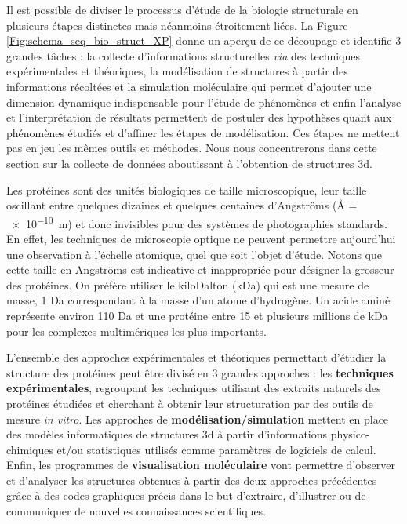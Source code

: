 Il est possible de diviser le processus d'étude de la biologie structurale en plusieurs étapes distinctes mais néanmoins étroitement liées.
La Figure \ref{Fig:schema_seq_bio_struct_XP} donne un aperçu de ce découpage et identifie 3 grandes tâches : la collecte d'informations structurelles \textit{via} des techniques expérimentales et théoriques, la modélisation de structures à partir des informations récoltées et la simulation moléculaire qui permet d'ajouter une dimension dynamique indispensable pour l'étude de phénomènes et enfin l'analyse et l'interprétation de résultats permettent de postuler des hypothèses quant aux phénomènes étudiés et d'affiner les étapes de modélisation.
Ces étapes ne mettent pas en jeu les mêmes outils et méthodes. Nous nous concentrerons dans cette section sur la collecte de données aboutissant à l'obtention de structures 3d.

Les protéines sont des unités biologiques de taille microscopique, leur taille oscillant entre quelques dizaines et quelques centaines d'Angströms (\r{A} = \SI{e-10}{\metre}) et donc invisibles pour des systèmes de photographies standards. En effet, les techniques de microscopie optique ne peuvent permettre aujourd'hui une observation à l'échelle atomique, quel que soit l'objet d'étude. Notons que cette taille en Angströms est indicative et inappropriée pour désigner la grosseur des protéines. On préfère utiliser le kiloDalton (kDa) qui est une mesure de masse, 1 Da correspondant à la masse d'un atome d'hydrogène. Un acide aminé représente environ 110 Da et une protéine entre 15 et plusieurs millions de kDa pour les complexes multimériques les plus importants.

L'ensemble des approches expérimentales et théoriques permettant d'étudier la structure des protéines peut être divisé en 3 grandes approches : les \textbf{techniques expérimentales}, regroupant les techniques utilisant des extraits naturels des protéines étudiées et cherchant à obtenir leur structuration par des outils de mesure \textit{in vitro}. Les approches de \textbf{modélisation/simulation} mettent en place des modèles informatiques de structures 3d à partir d'informations physico-chimiques et/ou statistiques utilisés comme paramètres de logiciels de calcul. Enfin, les programmes de \textbf{visualisation moléculaire} vont permettre d'observer et d'analyser les structures obtenues à partir des deux approches précédentes grâce à des codes graphiques précis dans le but d'extraire, d'illustrer ou de communiquer de nouvelles connaissances scientifiques.

